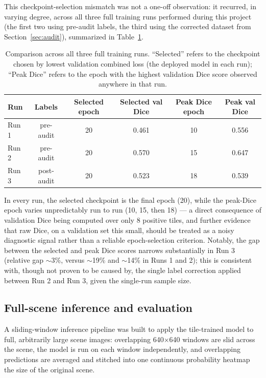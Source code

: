 \documentclass[11pt,a4paper]{article}
\begin{document}
This checkpoint-selection mismatch was not a one-off observation: it
recurred, in varying degree, across all three full training runs performed
during this project (the first two using pre-audit labels, the third using
the corrected dataset from Section~\ref{sec:audit}), summarized in
Table~\ref{tab:runs}.

\begin{table}[htbp]
\centering
\caption{Comparison across all three full training runs. ``Selected''
refers to the checkpoint chosen by lowest validation combined loss (the
deployed model in each run); ``Peak Dice'' refers to the epoch with the
highest validation Dice score observed anywhere in that run.}
\label{tab:runs}
\begin{tabular}{lccccc}
\toprule
\textbf{Run} & \textbf{Labels} & \textbf{Selected epoch} & \textbf{Selected val Dice} & \textbf{Peak Dice epoch} & \textbf{Peak val Dice} \\
\midrule
Run 1 & pre-audit  & 20 & 0.461 & 10 & 0.556 \\
Run 2 & pre-audit  & 20 & 0.570 & 15 & 0.647 \\
Run 3 & post-audit & 20 & 0.523 & 18 & 0.539 \\
\bottomrule
\end{tabular}
\end{table}

In every run, the selected checkpoint is the final epoch (20), while the
peak-Dice epoch varies unpredictably run to run (10, 15, then 18) --- a
direct consequence of validation Dice being computed over only 8 positive
tiles, and further evidence that raw Dice, on a validation set this small,
should be treated as a noisy diagnostic signal rather than a reliable
epoch-selection criterion. Notably, the gap between the selected and peak
Dice scores narrows substantially in Run 3 (relative gap $\sim$3\%, versus
$\sim$19\% and $\sim$14\% in Runs 1 and 2); this is consistent with, though
not proven to be caused by, the single label correction applied between
Run 2 and Run 3, given the single-run sample size.

\subsection{Full-scene inference and evaluation}
\label{sec:falsepos}
A sliding-window inference pipeline was built to apply the tile-trained
model to full, arbitrarily large scene images: overlapping 640$\times$640
windows are slid across the scene, the model is run on each window
independently, and overlapping predictions are averaged and stitched into
one continuous probability heatmap the size of the original scene.
\end{document}
